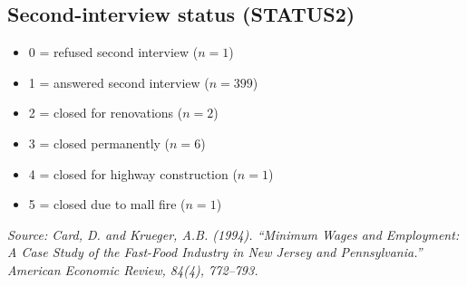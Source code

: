 \documentclass[11pt]{article}
\begin{document}
\subsection*{Second-interview status (STATUS2)}
\begin{itemize}
  \item 0 = refused second interview ($n=1$)
  \item 1 = answered second interview ($n=399$)
  \item 2 = closed for renovations ($n=2$)
  \item 3 = closed permanently ($n=6$)
  \item 4 = closed for highway construction ($n=1$)
  \item 5 = closed due to mall fire ($n=1$)
\end{itemize}

\vspace{1em}
\noindent\textit{Source: Card, D. and Krueger, A.B. (1994). ``Minimum Wages and Employment: A Case Study
of the Fast-Food Industry in New Jersey and Pennsylvania.'' \textit{American Economic Review}, 84(4), 772--793.}
\end{document}
